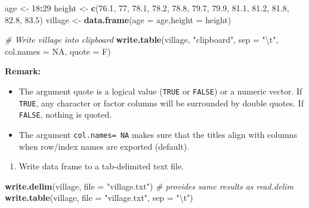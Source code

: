 \documentclass[]{book}
\newenvironment{Shaded}{\begin{snugshade}}{\end{snugshade}}
\newcommand{\KeywordTok}[1]{\textcolor[rgb]{0.13,0.29,0.53}{\textbf{#1}}}
\newcommand{\DataTypeTok}[1]{\textcolor[rgb]{0.13,0.29,0.53}{#1}}
\newcommand{\DecValTok}[1]{\textcolor[rgb]{0.00,0.00,0.81}{#1}}
\newcommand{\FloatTok}[1]{\textcolor[rgb]{0.00,0.00,0.81}{#1}}
\newcommand{\CharTok}[1]{\textcolor[rgb]{0.31,0.60,0.02}{#1}}
\newcommand{\StringTok}[1]{\textcolor[rgb]{0.31,0.60,0.02}{#1}}
\newcommand{\CommentTok}[1]{\textcolor[rgb]{0.56,0.35,0.01}{\textit{#1}}}
\newcommand{\OtherTok}[1]{\textcolor[rgb]{0.56,0.35,0.01}{#1}}
\newcommand{\OperatorTok}[1]{\textcolor[rgb]{0.81,0.36,0.00}{\textbf{#1}}}
\newcommand{\NormalTok}[1]{#1}
\providecommand{\tightlist}{%
  \setlength{\itemsep}{0pt}\setlength{\parskip}{0pt}}
\begin{document}
\begin{Shaded}
\begin{Highlighting}[]
\NormalTok{age <-}\StringTok{ }\DecValTok{18}\OperatorTok{:}\DecValTok{29}
\NormalTok{height <-}\StringTok{ }\KeywordTok{c}\NormalTok{(}\FloatTok{76.1}\NormalTok{, }\DecValTok{77}\NormalTok{, }\FloatTok{78.1}\NormalTok{, }\FloatTok{78.2}\NormalTok{, }\FloatTok{78.8}\NormalTok{, }\FloatTok{79.7}\NormalTok{, }\FloatTok{79.9}\NormalTok{, }\FloatTok{81.1}\NormalTok{, }\FloatTok{81.2}\NormalTok{, }
            \FloatTok{81.8}\NormalTok{, }\FloatTok{82.8}\NormalTok{, }\FloatTok{83.5}\NormalTok{)}
\NormalTok{village <-}\StringTok{ }\KeywordTok{data.frame}\NormalTok{(}\DataTypeTok{age =}\NormalTok{ age,}\DataTypeTok{height =}\NormalTok{ height) }

\CommentTok{# Write village into clipboard}
\KeywordTok{write.table}\NormalTok{(village, }\StringTok{"clipboard"}\NormalTok{, }\DataTypeTok{sep =} \StringTok{"}\CharTok{\textbackslash{}t}\StringTok{"}\NormalTok{, }\DataTypeTok{col.names =} \OtherTok{NA}\NormalTok{, }
            \DataTypeTok{quote =}\NormalTok{ F) }
\end{Highlighting}
\end{Shaded}

\textbf{Remark:}

\begin{itemize}
\item
  The argument quote is a logical value (\texttt{TRUE} or
  \texttt{FALSE}) or a numeric vector. If \texttt{TRUE}, any character
  or factor columns will be surrounded by double quotes. If
  \texttt{FALSE}, nothing is quoted.
\item
  The argument \texttt{col.names=\ NA} makes sure that the titles align
  with columns when row/index names are exported (default).
\end{itemize}

\begin{enumerate}
\def\labelenumi{\arabic{enumi}.}
\setcounter{enumi}{1}
\tightlist
\item
  Write data frame to a tab-delimited text file.
\end{enumerate}

\begin{Shaded}
\begin{Highlighting}[]
\KeywordTok{write.delim}\NormalTok{(village, }\DataTypeTok{file =} \StringTok{"village.txt"}\NormalTok{)}
\CommentTok{# provides same results as read.delim}
\KeywordTok{write.table}\NormalTok{(village, }\DataTypeTok{file =} \StringTok{"village.txt"}\NormalTok{, }\DataTypeTok{sep =} \StringTok{"}\CharTok{\textbackslash{}t}\StringTok{"}\NormalTok{)}
\end{Highlighting}
\end{Shaded}
\end{document}
